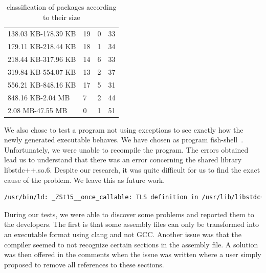 \documentclass[a4paper,11pt,oneside]{report}
\begin{document}
\begin{table}[H]
\begin{tabular}{llll}
        138.03 KB-178.39 KB & 19                           & 0                                 & 33                                    \\
        179.11 KB-218.44 KB & 18                           & 1                                 & 34                                    \\
        218.44 KB-317.96 KB & 14                           & 6                                 & 33                                    \\
        319.84 KB-554.07 KB & 13                           & 2                                 & 37                                    \\
        556.21 KB-848.16 KB & 17                           & 5                                 & 31                                    \\
        848.16 KB-2.04 MB   & 7                            & 2                                 & 44                                    \\
        2.08 MB-47.55 MB    & 0                            & 1                                 & 51    \\                               
        \hline
    \end{tabular}
    \caption{classification of packages according to their size}
\end{table}

We also chose to test a program not using exceptions to see exactly how the
newly generated executable behaves. We have chosen as program
fish-shell~\cite{fish}. Unfortunately, we were unable to recompile the program.
The errors obtained lead us to understand that there was an error concerning
the shared library libstdc++.so.6. Despite our research, it was quite difficult
for us to find the exact cause of the problem. We leave this as future work.
\begin{lstlisting}[language=bash]
/usr/bin/ld: _ZSt15__once_callable: TLS definition in /usr/lib/libstdc++.so.6 section .tbss mismatches non-TLS reference in /tmp/ccAGaHdi.o
\end{lstlisting}

During our tests, we were able to discover some problems and reported them to
the developers. The first is that some assembly files can only be
transformed into an executable format using clang and not GCC. Another issue was
that the compiler seemed to not recognize certain sections in the assembly
file. A solution was then offered in the comments when the issue was written
where a user simply proposed to remove all references to these sections.
\end{document}
